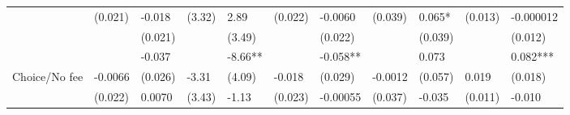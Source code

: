 \begin{tabular}{rrrrrrrrrrr}
\cmidrule{3-3}\cmidrule{5-5}\cmidrule{7-7}\cmidrule{9-9}\cmidrule{11-11}\multicolumn{1}{l}{} & \multicolumn{1}{l}{(0.021)} & \multicolumn{1}{l}{\cellcolor[rgb]{ .859,  .859,  .859} -0.018} & \multicolumn{1}{l}{(3.32)} & \multicolumn{1}{l}{\cellcolor[rgb]{ .859,  .859,  .859} 2.89} & \multicolumn{1}{l}{(0.022)} & \multicolumn{1}{l}{\cellcolor[rgb]{ .859,  .859,  .859} -0.0060} & \multicolumn{1}{l}{(0.039)} & \multicolumn{1}{l}{\cellcolor[rgb]{ .859,  .859,  .859} 0.065*} & \multicolumn{1}{l}{(0.013)} & \multicolumn{1}{l}{\cellcolor[rgb]{ .859,  .859,  .859} -0.000012} \\
      &       & \multicolumn{1}{l}{\cellcolor[rgb]{ .859,  .859,  .859} (0.021)} &       & \multicolumn{1}{l}{\cellcolor[rgb]{ .859,  .859,  .859} (3.49)} &       & \multicolumn{1}{l}{\cellcolor[rgb]{ .859,  .859,  .859} (0.022)} &       & \multicolumn{1}{l}{\cellcolor[rgb]{ .859,  .859,  .859} (0.039)} &       & \multicolumn{1}{l}{\cellcolor[rgb]{ .859,  .859,  .859} (0.012)} \\
\cmidrule{9-9}\cmidrule{11-11}      &       & \multicolumn{1}{l}{\cellcolor[rgb]{ .929,  .929,  .929} -0.037} &       & \multicolumn{1}{l}{\cellcolor[rgb]{ .929,  .929,  .929} -8.66**} &       & \multicolumn{1}{l}{\cellcolor[rgb]{ .929,  .929,  .929} -0.058**} &       & \multicolumn{1}{l}{\cellcolor[rgb]{ .929,  .929,  .929} 0.073} &       & \multicolumn{1}{l}{\cellcolor[rgb]{ .929,  .929,  .929} 0.082***} \\
\multicolumn{1}{l}{Choice/No fee} & \multicolumn{1}{l}{-0.0066} & \multicolumn{1}{l}{\cellcolor[rgb]{ .929,  .929,  .929} (0.026)} & \multicolumn{1}{l}{-3.31} & \multicolumn{1}{l}{\cellcolor[rgb]{ .929,  .929,  .929} (4.09)} & \multicolumn{1}{l}{-0.018} & \multicolumn{1}{l}{\cellcolor[rgb]{ .929,  .929,  .929} (0.029)} & \multicolumn{1}{l}{-0.0012} & \multicolumn{1}{l}{\cellcolor[rgb]{ .929,  .929,  .929} (0.057)} & \multicolumn{1}{l}{0.019} & \multicolumn{1}{l}{\cellcolor[rgb]{ .929,  .929,  .929} (0.018)} \\
\cmidrule{3-3}\cmidrule{5-5}\cmidrule{9-9}\cmidrule{11-11}\multicolumn{1}{l}{} & \multicolumn{1}{l}{(0.022)} & \multicolumn{1}{l}{\cellcolor[rgb]{ .859,  .859,  .859} 0.0070} & \multicolumn{1}{l}{(3.43)} & \multicolumn{1}{l}{\cellcolor[rgb]{ .859,  .859,  .859} -1.13} & \multicolumn{1}{l}{(0.023)} & \multicolumn{1}{l}{\cellcolor[rgb]{ .859,  .859,  .859} -0.00055} & \multicolumn{1}{l}{(0.037)} & \multicolumn{1}{l}{\cellcolor[rgb]{ .859,  .859,  .859} -0.035} & \multicolumn{1}{l}{(0.011)} & \multicolumn{1}{l}{\cellcolor[rgb]{ .859,  .859,  .859} -0.010} \\

\end{tabular}
